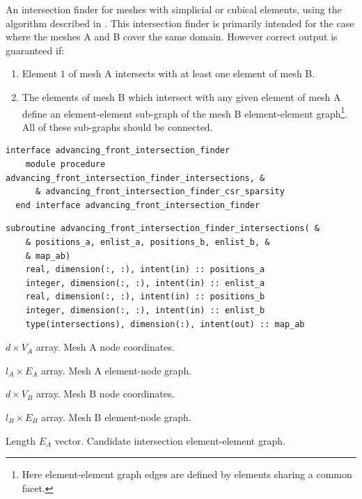 \documentclass{article}
\begin{document}
An intersection finder for meshes with simplicial or cubical elements, using
the algorithm described in \citet{farrell2011}
\citep[see also][]{gander2009,gander2013}. This intersection finder is primarily
intended for the case where the meshes A and B cover the same domain. However
correct output is guaranteed if:
\begin{enumerate}
  \item Element $1$ of mesh A intersects with at least one element of mesh B.
  \item The elements of mesh B which intersect with any given element of mesh A
        define an element-element sub-graph of the mesh B element-element
        graph\footnote{Here element-element graph edges are defined by elements
        sharing a common facet.}. All of these sub-graphs should be connected. 
\end{enumerate}

\begin{lstlisting}[language=FORTRAN]
  interface advancing_front_intersection_finder
    module procedure advancing_front_intersection_finder_intersections, &
      & advancing_front_intersection_finder_csr_sparsity
  end interface advancing_front_intersection_finder
\end{lstlisting}

\begin{lstlisting}[language=FORTRAN]
  subroutine advancing_front_intersection_finder_intersections( &
    & positions_a, enlist_a, positions_b, enlist_b, &
    & map_ab)
    real, dimension(:, :), intent(in) :: positions_a
    integer, dimension(:, :), intent(in) :: enlist_a
    real, dimension(:, :), intent(in) :: positions_b
    integer, dimension(:, :), intent(in) :: enlist_b
    type(intersections), dimension(:), intent(out) :: map_ab
\end{lstlisting}

\begin{description}[font=\ttfamily\bfseries,leftmargin=2.2\parindent,labelindent=1.7\parindent,noitemsep]
  \item[positions\_a] $d \times V_A$ array. Mesh A node coordinates.
  \item[enlist\_a] $l_A \times E_A$ array. Mesh A element-node graph.
  \item[positions\_b] $d \times V_B$ array. Mesh B node coordinates.
  \item[enlist\_b] $l_B \times E_B$ array. Mesh B element-node graph.
  \item[map\_ab] Length $E_A$ vector. Candidate intersection element-element
    graph.
\end{description}
\end{document}

